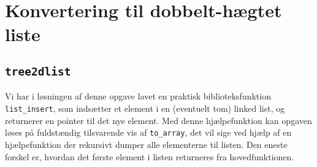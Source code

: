 \section{Konvertering til dobbelt-hægtet liste}

\subsection{\tt tree2dlist}

Vi har i løsningen af denne opgave lavet en praktisk biblioteksfunktion {\tt
list\_insert}, som indsætter et element i en (eventuelt tom) linked list, og
returnerer en pointer til det nye element. Med denne hjælpefunktion kan opgaven
løses på fuldstændig tilsvarende vis af {\tt to\_array}, det vil sige ved
hjælp af en hjælpefunktion der rekursivt dumper alle elementerne til listen.
Den eneste forskel er, hvordan det første element i listen returneres fra
hovedfunktionen.
